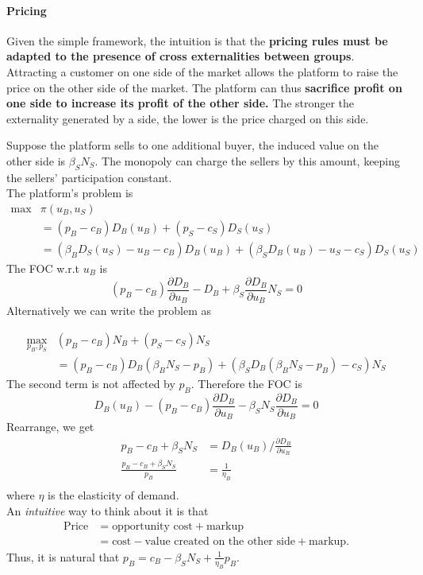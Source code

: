 \paragraph{Pricing}
\begin{remark}
Given the simple framework, the intuition is that the \textbf{pricing rules must be adapted to the presence of cross externalities between groups}. Attracting a customer on one side of the market allows the platform to raise the price on the other side of the market. The platform can thus \textbf{sacrifice profit on one side to increase its profit of the other side.}  The stronger the externality generated by a side, the lower is the price charged on this side.
\end{remark}
Suppose the platform sells to one additional buyer, the induced value on the other side is $\beta_SN_S$. The monopoly can charge the sellers by this amount, keeping the sellers' participation constant.\\The platform's problem is
\begin{equation*}
    \begin{array}{ll}
        \text{max} &  \pi(u_B,u_S)\\&=(p_B-c_B)D_B(u_B)+(p_S-c_S)D_S(u_S)\\
         &=(\beta_B D_S(u_S)-u_B-c_B)D_B(u_B)+(\beta_S D_B(u_B)-u_S-c_S)D_S(u_S)
    \end{array}
\end{equation*}
The FOC w.r.t $u_B$ is 
\begin{equation*}
    (p_B-c_B)\frac{\partial D_B}{\partial u_B}-D_B+\beta_S\frac{\partial D_B}{\partial u_B}N_S=0
\end{equation*}
Alternatively we can write the problem as

\begin{equation*}
    \begin{array}{ll}
        \max_{p_B,p_S} & (p_B-c_B)N_B+(p_S-c_S)N_S\\
         &=(p_B-c_B)D_B(\beta_B N_S-p_B)+(\beta_S D_B(\beta_B N_S-p_B)-c_S)N_S
    \end{array}
\end{equation*}
The second term is not affected by $p_B$. Therefore the FOC is \begin{equation*}
    D_B(u_B)-(p_B-c_B)\frac{\partial D_B}{\partial u_B}-\beta_S N_S\frac{\partial D_B}{\partial u_B}=0
\end{equation*}
Rearrange, we get 
\begin{align*}
    p_B-c_B+\beta_S N_S&= D_B(u_B)/\frac{\partial D_B}{\partial u_B}\\
    \frac{p_B-c_B+\beta_S N_S}{p_B}&= \frac{1}{\eta_B}\\
\end{align*}
where $\eta$ is the elasticity of demand.\\
An \emph{intuitive} way to think about it is that 
\begin{align*}
    \text{Price} &= \text{opportunity cost} + \text{markup}\\
    &=\text{cost}-\text{value created on the other side}+ \text{markup}.
\end{align*}
Thus, it is natural that $p_B=c_B-\beta_S N_S+\frac{1}{\eta_B}p_B$.
